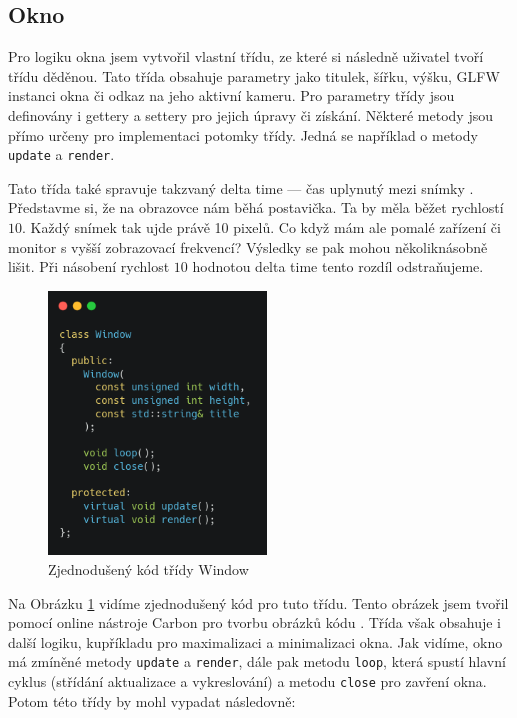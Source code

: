 \documentclass[12pt]{article}
\begin{document}
\subsection{Okno}

Pro logiku okna jsem vytvořil vlastní třídu, ze které si následně uživatel tvoří třídu děděnou. Tato třída obsahuje parametry jako titulek, šířku, výšku, GLFW instanci okna či odkaz na jeho aktivní kameru. Pro parametry třídy jsou definovány i gettery a settery pro jejich úpravy či získání. Některé metody jsou přímo určeny pro implementaci potomky třídy. Jedná se například o metody \texttt{update} a \texttt{render}.

Tato třída také spravuje takzvaný delta time — čas uplynutý mezi snímky \cite{delta_time}. Představme si, že na obrazovce nám běhá postavička. Ta by měla běžet rychlostí $10$. Každý snímek tak ujde právě 10 pixelů. Co když mám ale pomalé zařízení či monitor s vyšší zobrazovací frekvencí? Výsledky se pak mohou několiknásobně lišit. Při násobení rychlost $10$ hodnotou delta time tento rozdíl odstraňujeme.

\vspace{0.5cm}
\begin{figure}[h]
    \centering
    \includegraphics[height=7cm]{images/window_code.png}
    \caption{Zjednodušený kód třídy Window}
    \label{fig:Zjednodušený kód třídy Window}
\end{figure}

Na Obrázku \ref{fig:Zjednodušený kód třídy Window} vidíme zjednodušený kód pro tuto třídu. Tento obrázek jsem tvořil pomocí online nástroje Carbon pro tvorbu obrázků kódu \cite{carbon}. Třída však obsahuje i další logiku, kupříkladu pro maximalizaci a minimalizaci okna. Jak vidíme, okno má zmíněné metody \texttt{update} a \texttt{render}, dále pak metodu \texttt{loop}, která spustí hlavní cyklus (střídání aktualizace a vykreslování) a metodu \texttt{close} pro zavření okna. Potom této třídy by mohl vypadat následovně:
\end{document}
